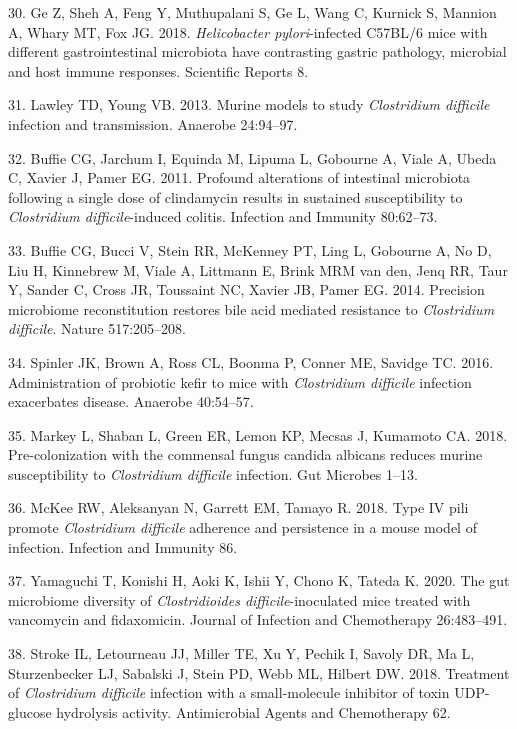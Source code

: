 \documentclass[11pt,]{article}
\begin{document}
\hypertarget{ref-Ge2018}{}
30. Ge Z, Sheh A, Feng Y, Muthupalani S, Ge L, Wang C, Kurnick S,
Mannion A, Whary MT, Fox JG. 2018. \emph{Helicobacter pylori}-infected
C57BL/6 mice with different gastrointestinal microbiota have contrasting
gastric pathology, microbial and host immune responses. Scientific
Reports 8.

\hypertarget{ref-Lawley2013}{}
31. Lawley TD, Young VB. 2013. Murine models to study \emph{Clostridium
difficile} infection and transmission. Anaerobe 24:94--97.

\hypertarget{ref-Buffie2011}{}
32. Buffie CG, Jarchum I, Equinda M, Lipuma L, Gobourne A, Viale A,
Ubeda C, Xavier J, Pamer EG. 2011. Profound alterations of intestinal
microbiota following a single dose of clindamycin results in sustained
susceptibility to \emph{Clostridium difficile}-induced colitis.
Infection and Immunity 80:62--73.

\hypertarget{ref-Buffie2014}{}
33. Buffie CG, Bucci V, Stein RR, McKenney PT, Ling L, Gobourne A, No D,
Liu H, Kinnebrew M, Viale A, Littmann E, Brink MRM van den, Jenq RR,
Taur Y, Sander C, Cross JR, Toussaint NC, Xavier JB, Pamer EG. 2014.
Precision microbiome reconstitution restores bile acid mediated
resistance to \emph{Clostridium difficile}. Nature 517:205--208.

\hypertarget{ref-Spinler2016}{}
34. Spinler JK, Brown A, Ross CL, Boonma P, Conner ME, Savidge TC. 2016.
Administration of probiotic kefir to mice with \emph{Clostridium
difficile} infection exacerbates disease. Anaerobe 40:54--57.

\hypertarget{ref-Markey2018}{}
35. Markey L, Shaban L, Green ER, Lemon KP, Mecsas J, Kumamoto CA. 2018.
Pre-colonization with the commensal fungus candida albicans reduces
murine susceptibility to \emph{Clostridium difficile} infection. Gut
Microbes 1--13.

\hypertarget{ref-McKee2018}{}
36. McKee RW, Aleksanyan N, Garrett EM, Tamayo R. 2018. Type IV pili
promote \emph{Clostridium difficile} adherence and persistence in a
mouse model of infection. Infection and Immunity 86.

\hypertarget{ref-Yamaguchi2020}{}
37. Yamaguchi T, Konishi H, Aoki K, Ishii Y, Chono K, Tateda K. 2020.
The gut microbiome diversity of \emph{Clostridioides
difficile}-inoculated mice treated with vancomycin and fidaxomicin.
Journal of Infection and Chemotherapy 26:483--491.

\hypertarget{ref-Stroke2018}{}
38. Stroke IL, Letourneau JJ, Miller TE, Xu Y, Pechik I, Savoly DR, Ma
L, Sturzenbecker LJ, Sabalski J, Stein PD, Webb ML, Hilbert DW. 2018.
Treatment of \emph{Clostridium difficile} infection with a
small-molecule inhibitor of toxin UDP-glucose hydrolysis activity.
Antimicrobial Agents and Chemotherapy 62.
\end{document}
